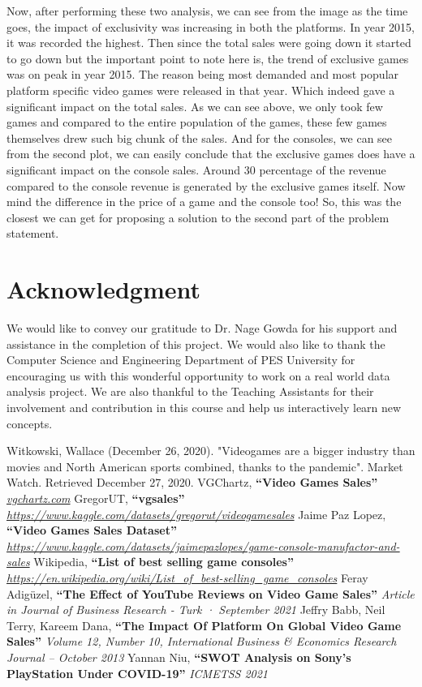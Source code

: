 \documentclass[conference]{IEEEtran}
\begin{document}
Now, after performing these two analysis, we can see from the image as the time goes, the impact of exclusivity was increasing in both the platforms. In year 2015, it was recorded the highest. Then since the total sales were going down it started to go down but the important point to note here is, the trend of exclusive games was on peak in year 2015. The reason being most demanded and most popular platform specific video games were released in that year. Which indeed gave a significant impact on the total sales. As we can see above, we only took few games and compared to the entire population of the games, these few games themselves drew such big chunk of the sales. And for the consoles, we can see from the second plot, we can easily conclude that the exclusive games does have a significant impact on the console sales. Around 30 percentage of the revenue compared to the console revenue is generated by the exclusive games itself. Now mind the difference in the price of a game and the console too! So, this was the closest we can get for proposing a solution to the second part of the problem statement.

\section{Acknowledgment}
We would like to convey our gratitude to Dr. Nage Gowda for his support and assistance in the completion of this project. We would also like to thank the Computer Science and Engineering Department of PES University for encouraging us with this wonderful opportunity to work on a real world data analysis project. We are also thankful to the Teaching Assistants for their involvement and contribution in this course and help us interactively learn new concepts.

\begin{thebibliography}{00}
     Witkowski, Wallace (December 26, 2020). "Videogames are a bigger industry than movies and North American sports combined, thanks to the pandemic". Market Watch. Retrieved December 27, 2020.
     VGChartz, \textbf{``Video Games Sales''} \textit{\url{vgchartz.com}}
     GregorUT, \textbf{``vgsales''} \textit{\url{https://www.kaggle.com/datasets/gregorut/videogamesales}}
     Jaime Paz Lopez, \textbf{``Video Games Sales Dataset''} \textit{\url{https://www.kaggle.com/datasets/jaimepazlopes/game-console-manufactor-and-sales}}
     Wikipedia, \textbf{``List of best selling game consoles''} \textit{\url{https://en.wikipedia.org/wiki/List_of_best-selling_game_consoles}}
     Feray Adigüzel, \textbf{``The Effect of YouTube Reviews on Video Game Sales''} \textit{Article  in  Journal of Business Research - Turk · September 2021}
     Jeffry Babb, Neil Terry, Kareem Dana, \textbf{``The Impact Of Platform On Global Video Game Sales''} \textit{Volume 12, Number 10, International Business \& Economics Research Journal – October 2013}
     Yannan Niu, \textbf{``SWOT Analysis on Sony's PlayStation Under COVID-19''} \textit{ICMETSS 2021}

\end{thebibliography}
\end{document}
